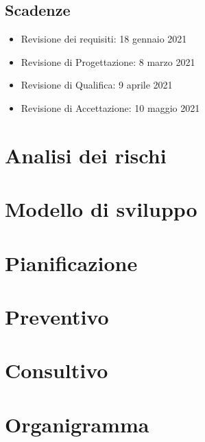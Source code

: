 \documentclass{article}
\begin{document}
\subsection{Scadenze}%
\label{sub:scad}

\begin{itemize}
    \item Revisione dei requisiti: 18 gennaio 2021
	\item Revisione di Progettazione: 8 marzo 2021
	\item Revisione di Qualifica: 9 aprile 2021
	\item Revisione di Accettazione: 10 maggio 2021

    \end{itemize}

\newpage
\section{Analisi dei rischi}
\label{sec:rischi}


\newpage
\section{Modello di sviluppo}
\label{sec:sviluppo}


\newpage
\section{Pianificazione}
\label{sec:pianif}


\newpage
\section{Preventivo}
\label{sec:prev}


\newpage
\section{Consultivo}
\label{sec:cons}


\newpage
\section{Organigramma}
\label{sec:org}

\end{document}
